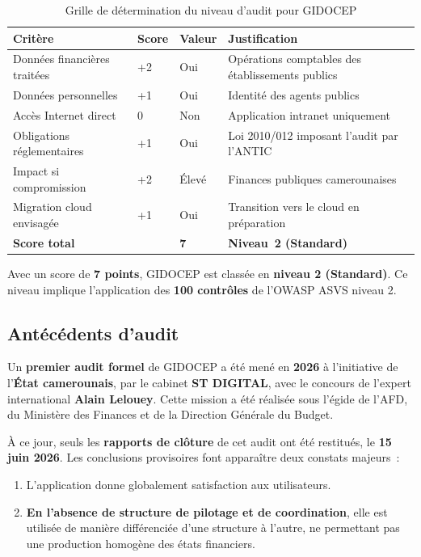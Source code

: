\documentclass[12pt,a4paper,oneside]{report}
\begin{document}
\begin{table}[H]
	\centering\small
	\caption{Grille de détermination du niveau d'audit pour GIDOCEP}
	\label{tab:niveau_gidocep}
	\begin{tabularx}{\textwidth}{p{4.5cm}p{2cm}p{2.5cm}X}
		\toprule
		\rowcolor{theadcolor}
		\color{white}\textbf{Critère} &
		\color{white}\textbf{Score} &
		\color{white}\textbf{Valeur} &
		\color{white}\textbf{Justification} \\
		\midrule
		Données financières traitées & +2 & Oui &
		Opérations comptables des établissements publics \\
		Données personnelles & +1 & Oui &
		Identité des agents publics \\
		Accès Internet direct & 0 & Non &
		Application intranet uniquement \\
		Obligations réglementaires & +1 & Oui &
		Loi 2010/012 imposant l'audit par l'ANTIC \\
		Impact si compromission & +2 & Élevé &
		Finances publiques camerounaises \\
		Migration cloud envisagée & +1 & Oui &
		Transition vers le cloud en préparation \\
		\midrule
		\textbf{Score total} & & \textbf{7} &
		\textbf{Niveau~2 (Standard)} \\
		\bottomrule
	\end{tabularx}
\end{table}

Avec un score de \textbf{7 points}, GIDOCEP est classée en \textbf{niveau 2 (Standard)}. Ce niveau implique l'application des \textbf{100 contrôles} de l'OWASP ASVS niveau 2.

\subsection{Antécédents d'audit}

Un \textbf{premier audit formel} de GIDOCEP a été mené en \textbf{2026} à l'initiative de l'\textbf{État camerounais}, par le cabinet \textbf{ST DIGITAL}, avec le concours de l'expert international \textbf{Alain Lelouey}. Cette mission a été réalisée sous l'égide de l'AFD, du Ministère des Finances et de la Direction Générale du Budget.

À ce jour, seuls les \textbf{rapports de clôture} de cet audit ont été restitués, le \textbf{15 juin 2026}. Les conclusions provisoires font apparaître deux constats majeurs~:

\begin{enumerate}[label={\color{gold}\theenumi.}, leftmargin=*]
	\item L'application donne globalement satisfaction aux utilisateurs.
	\item \textbf{En l'absence de structure de pilotage et de coordination}, elle est utilisée de manière différenciée d'une structure à l'autre, ne permettant pas une production homogène des états financiers.
\end{enumerate}
\end{document}
